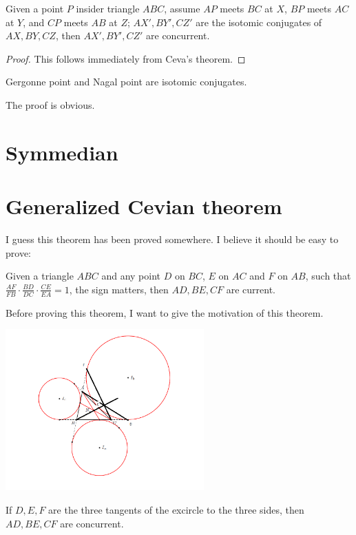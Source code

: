 \begin{definition}
Given a point $P$ insider triangle $ABC$, assume $AP$ meets $BC$ at $X$, $BP$ meets $AC$ at $Y$, and $CP$ meets
$AB$ at $Z$; $AX', BY', CZ'$ are the isotomic conjugates of $AX, BY, CZ$, then $AX', BY', CZ'$ are concurrent.
\end{definition}
\begin{proof}
This follows immediately from Ceva's theorem.
\end{proof}

\begin{theorem}
Gergonne point and Nagal point are isotomic conjugates.
\end{theorem}

The proof is obvious.


\section{Symmedian}

\section{Generalized Cevian theorem}

I guess this theorem has been proved somewhere.
I believe it should be easy to prove:

\begin{theorem}
Given a triangle $ABC$ and any point $D$ on $BC$, $E$ on $AC$ and $F$ on $AB$, such that $\frac{AF}{FB}\cdot \frac{BD}{DC}\cdot \frac{CE}{EA}=1$,
the sign matters, then $AD, BE, CF$ are current.

\end{theorem}

Before proving this theorem, I want to give the motivation of this theorem.

\begin{theorem}
\includegraphics[width=3in]{excircle1.png}

If $D, E, F$ are the three tangents of the excircle to the three sides, then $AD, BE, CF$ are concurrent.
\end{theorem}

